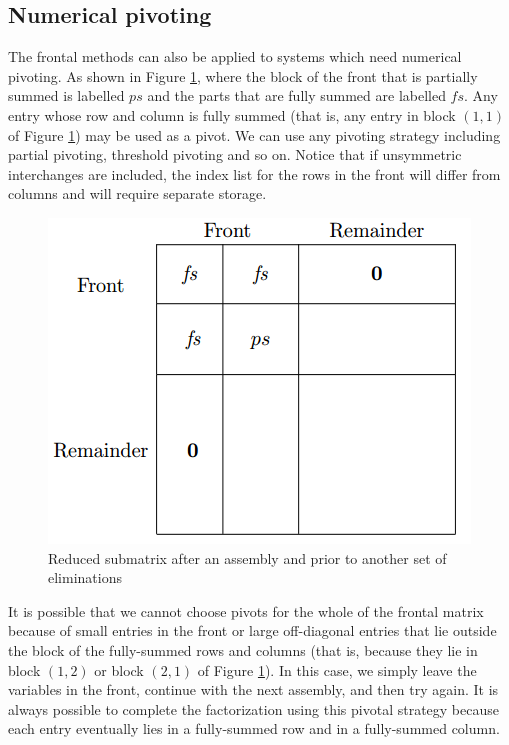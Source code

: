 \subsection{Numerical pivoting}
\begin{alg}
    The frontal methods can also be applied to systems which 
    need numerical pivoting. As shown in Figure 
    \ref{fig::pivotfrontal}, where the block of the front 
    that is partially summed is labelled $ps$ and the parts 
    that are fully summed are labelled $fs$. Any entry whose 
    row and column is fully summed (that is, any entry in block 
    $(1,1)$ of Figure \ref{fig::pivotfrontal}) may be used as a 
    pivot. We can use any pivoting strategy including partial 
    pivoting, threshold pivoting and so on. Notice that if 
    unsymmetric interchanges are included, the index list for 
    the rows in the front will differ from columns and will 
    require separate storage.
    \begin{figure}[H]
        \centering
        \includegraphics[width=0.8\linewidth]{png/pivotfrontal.png}
        \caption{Reduced submatrix after an assembly and prior 
        to another set of eliminations}
        \label{fig::pivotfrontal}
    \end{figure}

    It is possible that we cannot choose pivots for the whole 
    of the frontal matrix because of small entries in the front 
    or large off-diagonal entries that lie outside the block of 
    the fully-summed rows and columns (that is, because they 
    lie in block $(1,2)$ or block $(2,1)$ of Figure 
    \ref{fig::pivotfrontal}). In this case, we simply leave the
    variables in the front, continue with the next assembly, 
    and then try again. It is always possible to complete the 
    factorization using this pivotal strategy because each 
    entry eventually lies in a fully-summed row and in a 
    fully-summed column.
\end{alg}
